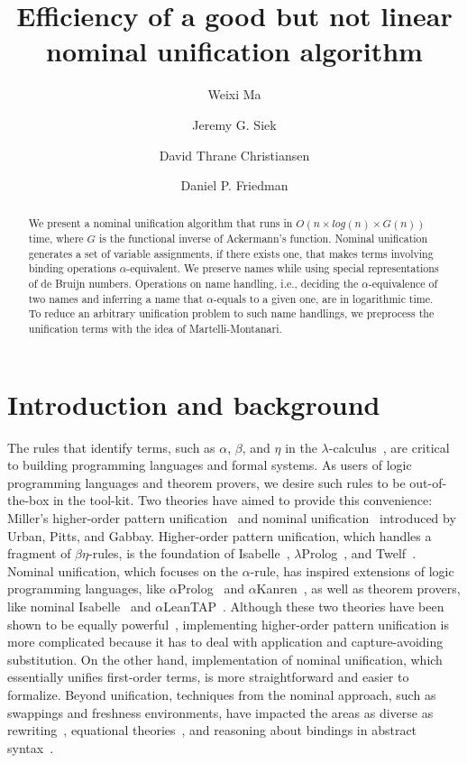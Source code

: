 \documentclass[a4paper,UKenglish]{lipics-v2016}
\title{Efficiency of a good but not linear nominal unification algorithm}
\author[1]{Weixi Ma}
\author[2]{Jeremy G. Siek}
\author[3]{David Thrane Christiansen}
\author[4]{Daniel P. Friedman}
\affil[1]{Indiana University,
  \texttt{mvc@iu.edu}}
\affil[2]{Indiana University,
  \texttt{jsiek@indiana.edu}}
\affil[3]{Galois, Inc.,
  \texttt{dtc@galois.com}}
\affil[4]{Indiana University,
  \texttt{dfried@indiana.edu}}
\begin{document}
\maketitle

\begin{abstract}
  We present a nominal unification algorithm
  that runs in $O(n \times log(n) \times G(n))$ time,
  where $G$ is the functional inverse of Ackermann's function.
  Nominal unification generates a set of variable assignments,
  if there exists one,
  that makes terms involving binding operations $\alpha$-equivalent.
  We preserve names while using special representations of de Bruijn numbers.
  Operations on name handling, i.e.,
  deciding the $\alpha$-equivalence of two names and
  inferring a name that $\alpha$-equals to a given one,
  are in logarithmic time.
  To reduce an arbitrary unification problem to such name handlings,
  we preprocess the unification terms
  with the idea of Martelli-Montanari.
\end{abstract}

\section{Introduction and background}
The rules that identify terms, such as $\alpha$, $\beta$, and $\eta$
in the $\lambda$-calculus~\cite{church_calculi_1941},
are critical to building programming languages and formal systems.
As users of logic programming languages and theorem provers,
we desire such rules to be out-of-the-box in the tool-kit.
Two theories have aimed to provide this convenience:
Miller's higher-order pattern unification~\cite{miller_logic_1989} and
nominal unification~\cite{urban_nominal_2004} introduced by Urban, Pitts, and Gabbay.
Higher-order pattern unification, which handles a fragment of $\beta\eta$-rules,
is the foundation of Isabelle~\cite{paulson_natural_1986}, $\lambda$Prolog~\cite{nadathur_overview_1988}, and Twelf~\cite{pfenning_system_1999-1}.
Nominal unification, which focuses on the $\alpha$-rule,
has inspired extensions of logic programming languages, like $\alpha$Prolog~\cite{cheney_prolog:_2004} and $\alpha$Kanren~\cite{byrd_alphakanren:_2007},
as well as theorem provers, like nominal Isabelle~\cite{urban_nominal_2005} and $\alpha$LeanTAP~\cite{near_leantap:_2008}.
Although these two theories have been shown to be equally powerful~\cite{cheney_relating_2005, levy_nominal_2012},
implementing higher-order pattern unification is more complicated
because it has to deal with application and capture-avoiding substitution.
On the other hand, implementation of nominal unification,
which essentially unifies first-order terms,
is more straightforward and easier to formalize.
Beyond unification, techniques from the nominal approach,
such as swappings and freshness environments,
have impacted the areas as diverse as
rewriting~\cite{fernandez_nominal_2004, fernandez_nominal_2005, fernandez_nominal_2007, aoto_nominal_2016},
equational theories~\cite{ayala-rincon_nominal_2016},
and reasoning about bindings in abstract syntax~\cite{pitts_metalanguage_2000, gabbay_new_2002}.
\end{document}
